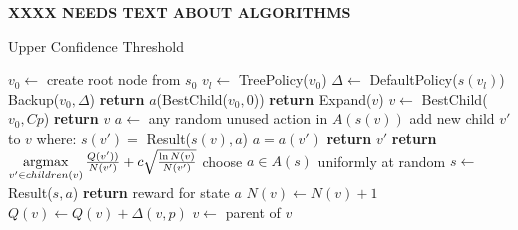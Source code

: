 \documentclass{ba-kecs}
\begin{document}
\textbf{XXXX NEEDS TEXT ABOUT ALGORITHMS}

\begin{algorithm}
	\caption{Upper Confidence Threshold}
    \label{UCT}
    \begin{algorithmic}
        	\State $v_0 \leftarrow$ create root node from $s_0$
            	\State $v_l \leftarrow$ TreePolicy($v_0$)
                \State $\Delta \leftarrow$ DefaultPolicy($s(v_l)$)
                \State Backup($v_0, \Delta$)
            \EndWhile
            \State \textbf{return} $a$(BestChild($v_0,0$))
        \EndFunction
        \State
                	\State \textbf{return} Expand($v$)
                \Else
                	\State $v \leftarrow$ BestChild($v_0,Cp$)
                \EndIf
            \EndWhile
           	\State \textbf{return} $v$
        \EndFunction
        \State
        	\State $a\leftarrow$ any random unused action in $A(s(v))$
            \State add new child $v'$ to $v$ where:
            \State $s(v') =$ Result($s(v),a$)
            \State $a = a(v')$
            \State \textbf{return} $v'$
        \EndFunction
        \State
        	\State \textbf{return} $\operatornamewithlimits{arg max}\limits_{v' \in children(v)}\frac{Q(v'))}{N(v')} + c\sqrt{\frac{\ln N(v)}{N(v')}}
$
        \EndFunction
        \State
            	\State choose $a \in A(s)$ uniformly at random
                \State $s \leftarrow$ Result($s, a$)
                \State \textbf{return} reward for state $a$
            \EndWhile
        \EndFunction
        \State
            	\State $N(v) \leftarrow N(v)+1$
                \State $Q(v) \leftarrow Q(v)+\Delta(v,p)$
                \State $v \leftarrow$ parent of $v$
            \EndWhile
        \EndFunction
    \end{algorithmic}
\end{algorithm}
\end{document}
